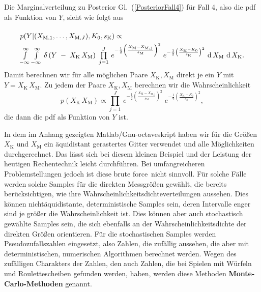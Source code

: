 Die Marginalverteilung zu Posterior Gl.~(\ref{PosteriorFall4}) für Fall 4, also
die pdf als Funktion von $Y$, sieht wie folgt aus
\begin{equation}
\arraycolsep=2.0pt\def\arraystretch{2.0}
\begin{array}{l}
p(Y | (X_{\mathrm{M},1}, \dots, X_{\mathrm{M},J}), K_0, s_\mathrm{K}) \propto \\
\int\limits_{-\infty}^\infty \int\limits_{-\infty}^\infty \,
\delta \left( Y \; - \; X_\mathrm{K} \, X_\mathrm{M}\right)
\; \prod\limits_{j=1}^J  \,
e^{-\frac{1}{2} \left(\frac{ X_\mathrm{M} - X_{\mathrm{M},j} }{s_\mathrm{M}} \right)^2}
\;  e^{-\frac{1}{2} \left(\frac{X_\mathrm{K} - K_0}{s_\mathrm{K}} \right)^2}  \,
\operatorname{d}X_\mathrm{M} \, \operatorname{d}X_\mathrm{K}.
\end{array}
\label{marginalPosteriorFall4}
\end{equation}
Damit berechnen wir für alle möglichen Paare $X_\mathrm{K}, X_\mathrm{M}$ direkt je ein
$Y$ mit $Y = X_\mathrm{K} \, X_\mathrm{M}$. Zu jedem der Paare $X_\mathrm{K}, X_\mathrm{M}$
berechnen wir die Wahrscheinlichkeit
$$
p(X_\mathrm{K} \, X_\mathrm{M}) \propto \prod\limits_{j=1}^J  \,
e^{-\frac{1}{2} \left(\frac{ X_\mathrm{M} - X_{\mathrm{M},j} }{s_\mathrm{M}} \right)^2}
\;  e^{-\frac{1}{2} \left(\frac{X_\mathrm{K} - K_0}{s_\mathrm{K}} \right)^2},
$$
die dann die pdf als Funktion von $Y$ ist.

In dem im Anhang gezeigten Matlab/Gnu-octaveskript haben wir für die Größen
$X_\mathrm{K}$ und $X_\mathrm{M}$ ein äquidistant gerastertes Gitter verwendet und alle
Möglichkeiten durchgerechnet. Das lässt sich bei diesem kleinen Beispiel und der Leistung
der heutigen Rechentechnik leicht durchführen. Bei umfangreicheren Problemstellungen jedoch
ist diese \glqq brute force\grqq ~nicht sinnvoll. Für solche Fälle
werden solche Samples für die direkten Messgrößen
gewählt, die bereits berücksichtigen, wie ihre Wahrscheinlichkeitsdichteverteilungen aussehen.
Dies können nichtäquidistante, deterministische Samples sein, deren Intervalle enger sind
je größer die Wahrscheinlichkeit ist. Dies können aber auch stochastisch gewählte Samples sein,
die sich ebenfalls an der Wahrscheinlichkeitsdichte der direkten Größen orientieren.
Für die stochastischen Samples werden Pseudozufallszahlen eingesetzt, also Zahlen, die zufällig
aussehen, die aber mit deterministischen, numerischen Algorithmen berechnet werden.
Wegen des zufälligen Charakters der Zahlen, den auch Zahlen, die bei Spielen mit Würfeln und
Roulettescheiben gefunden werden, haben, werden diese Methoden \textbf{Monte-Carlo-Methoden}
genannt.


